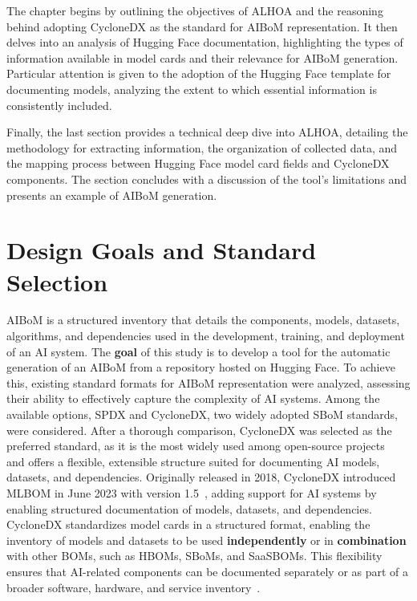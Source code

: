 \documentclass[12pt,a4paper, oneside, openright]{book}
\newcommand{\aibom}{{AIBoM}\xspace}
\newcommand{\sbom}{{SBoM}\xspace}
\newcommand{\sboms}{{SBoMs}\xspace}
\begin{document}
The chapter begins by outlining the objectives of ALHOA and the reasoning behind adopting CycloneDX as the standard for \aibom representation. It then delves into an analysis of Hugging Face documentation, highlighting the types of information available in model cards and their relevance for \aibom generation. 
Particular attention is given to the adoption of the Hugging Face template for documenting models, analyzing the extent to which essential information is consistently included.

Finally, the last section provides a technical deep dive into ALHOA, detailing the methodology for extracting information, the organization of collected data, and the mapping process between Hugging Face model card fields and CycloneDX components. The section concludes with a discussion of the tool's limitations and presents an example of \aibom generation.


\section{Design Goals and Standard Selection}
\aibom is a structured inventory that details the components, models, datasets, algorithms, and dependencies used in the development, training, and deployment of an AI system.
The \textbf{goal} of this study is to develop a tool for the automatic generation of an \aibom from a repository hosted on Hugging Face. %
To achieve this, existing standard formats for \aibom representation were analyzed, assessing their ability to effectively capture the complexity of AI systems. Among the available options, SPDX and CycloneDX, two widely adopted \sbom standards, were considered. After a thorough comparison, CycloneDX was selected as the preferred standard, as it is the most widely used among open-source projects~\cite{10336262} and offers a flexible, extensible structure suited for documenting AI models, datasets, and dependencies.
Originally released in 2018, CycloneDX introduced MLBOM in June 2023 with version 1.5~\cite{cyclonedx_history}, adding support for AI systems by enabling structured documentation of models, datasets, and dependencies.\\
CycloneDX standardizes model cards in a structured format, enabling the inventory of models and datasets to be used \textbf{independently} or in \textbf{combination} with other BOMs, such as HBOMs, \sboms, and SaaSBOMs. This flexibility ensures that AI-related components can be documented separately or as part of a broader software, hardware, and service inventory~\cite{cyclonedx_authoritative_guide}.
\end{document}
